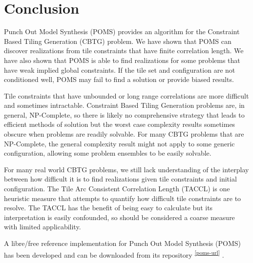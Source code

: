 \section{Conclusion}

Punch Out Model Synthesis (POMS) provides an algorithm for the Constraint Based Tiling Generation (CBTG) problem.
We have shown that POMS can discover realizations from tile constraints that have finite correlation length.
We have also shown that POMS is able to find realizations for some problems
that have weak implied global constraints.
If the tile set and configuration are not conditioned well,
POMS may fail to find a solution or provide biased results.

Tile constraints that have unbounded or long range correlations are more difficult and sometimes intractable.
Constraint Based Tiling Generation problems are, in general, NP-Complete, so there is likely
no comprehensive strategy that leads to efficient methods of solution but the worst case complexity
results sometimes obscure when problems are readily solvable.
For many CBTG problems that are NP-Complete, the general complexity result might not
apply to some generic configuration, allowing some problem ensembles
to be easily solvable.

For many real world CBTG problems, we still lack understanding of the
interplay between how difficult it is to find realizations given tile constraints
and initial configuration.
The Tile Arc Consistent Correlation Length (TACCL) is one heuristic measure that attempts
to quantify how difficult tile constraints are to resolve.
The TACCL has the benefit of being easy to calculate but its interpretation is easily confounded,
so should be considered a coarse measure with limited applicability.

A libre/free reference implementation for Punch Out Model Synthesis (POMS) has been developed and can be downloaded
from its repository \textsuperscript{ \ref{poms-url} }.

